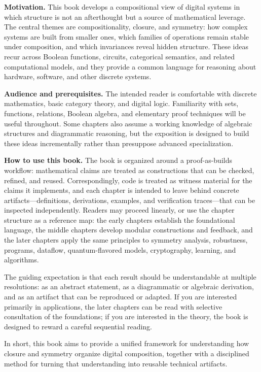 \noindent\textbf{Motivation.} This book develops a compositional view of digital systems in which structure is not an afterthought but a source of mathematical leverage. The central themes are compositionality, closure, and symmetry: how complex systems are built from smaller ones, which families of operations remain stable under composition, and which invariances reveal hidden structure. These ideas recur across Boolean functions, circuits, categorical semantics, and related computational models, and they provide a common language for reasoning about hardware, software, and other discrete systems.

\medskip
\noindent\textbf{Audience and prerequisites.} The intended reader is comfortable with discrete mathematics, basic category theory, and digital logic. Familiarity with sets, functions, relations, Boolean algebra, and elementary proof techniques will be useful throughout. Some chapters also assume a working knowledge of algebraic structures and diagrammatic reasoning, but the exposition is designed to build these ideas incrementally rather than presuppose advanced specialization.

\medskip
\noindent\textbf{How to use this book.} The book is organized around a proof-as-builds workflow: mathematical claims are treated as constructions that can be checked, refined, and reused. Correspondingly, code is treated as witness material for the claims it implements, and each chapter is intended to leave behind concrete artifacts---definitions, derivations, examples, and verification traces---that can be inspected independently. Readers may proceed linearly, or use the chapter structure as a reference map: the early chapters establish the foundational language, the middle chapters develop modular constructions and feedback, and the later chapters apply the same principles to symmetry analysis, robustness, programs, dataflow, quantum-flavored models, cryptography, learning, and algorithms.

\medskip
\noindent The guiding expectation is that each result should be understandable at multiple resolutions: as an abstract statement, as a diagrammatic or algebraic derivation, and as an artifact that can be reproduced or adapted. If you are interested primarily in applications, the later chapters can be read with selective consultation of the foundations; if you are interested in the theory, the book is designed to reward a careful sequential reading.

\medskip
\noindent In short, this book aims to provide a unified framework for understanding how closure and symmetry organize digital composition, together with a disciplined method for turning that understanding into reusable technical artifacts.
